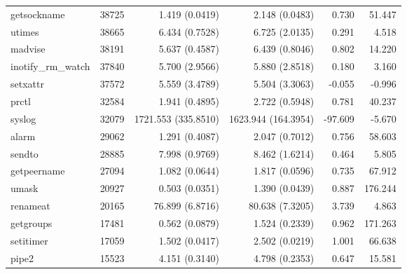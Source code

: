 \begin{longtable}{>{\ttfamily}lrrrrr}
                    getsockname &      38725 &              1.419 (0.0419) &            2.148 (0.0483) &           0.730 &       51.447 \\
                         utimes &      38665 &              6.434 (0.7528) &            6.725 (2.0135) &           0.291 &        4.518 \\
                        madvise &      38191 &              5.637 (0.4587) &            6.439 (0.8046) &           0.802 &       14.220 \\
             inotify\_rm\_watch &      37840 &              5.700 (2.9566) &            5.880 (2.8518) &           0.180 &        3.160 \\
                       setxattr &      37572 &              5.559 (3.4789) &            5.504 (3.3063) &          -0.055 &       -0.996 \\
                          prctl &      32584 &              1.941 (0.4895) &            2.722 (0.5948) &           0.781 &       40.237 \\
                         syslog &      32079 &         1721.553 (335.8510) &       1623.944 (164.3954) &         -97.609 &       -5.670 \\
                          alarm &      29062 &              1.291 (0.4087) &            2.047 (0.7012) &           0.756 &       58.603 \\
                         sendto &      28885 &              7.998 (0.9769) &            8.462 (1.6214) &           0.464 &        5.805 \\
                    getpeername &      27094 &              1.082 (0.0644) &            1.817 (0.0596) &           0.735 &       67.912 \\
                          umask &      20927 &              0.503 (0.0351) &            1.390 (0.0439) &           0.887 &      176.244 \\
                       renameat &      20165 &             76.899 (6.8716) &           80.638 (7.3205) &           3.739 &        4.863 \\
                      getgroups &      17481 &              0.562 (0.0879) &            1.524 (0.2339) &           0.962 &      171.263 \\
                      setitimer &      17059 &              1.502 (0.0417) &            2.502 (0.0219) &           1.001 &       66.638 \\
                          pipe2 &      15523 &              4.151 (0.3140) &            4.798 (0.2353) &           0.647 &       15.581 \\

\end{longtable}
